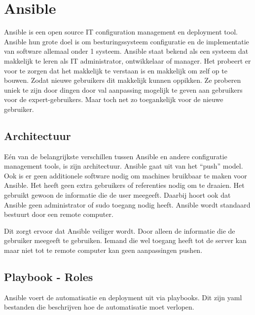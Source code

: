 \section{Ansible}
Ansible is een open source IT configuration management en deployment tool. Ansible hun grote doel is om besturingssysteem configuratie en de implementatie van software allemaal onder 1 systeem. Ansible staat bekend als een systeem dat makkelijk te leren als IT administrator, ontwikkelaar of manager. Het probeert er voor te zorgen dat het makkelijk te verstaan is en makkelijk om zelf op te bouwen. Zodat nieuwe gebruikers dit makkelijk kunnen oppikken. Ze proberen uniek te zijn door dingen door val aanpassing mogelijk te geven aan gebruikers voor de expert-gebruikers. Maar toch net zo toegankelijk voor de nieuwe gebruiker.

\subsection{Architectuur}
Eén van de belangrijkste verschillen tussen Ansible en andere configuratie management tools, is zijn architectuur. Ansible gaat uit van het ``push'' model. Ook is er geen additionele software nodig om machines bruikbaar te maken voor Ansible. Het heeft geen extra gebruikers of referenties nodig om te draaien. Het gebruikt gewoon de informatie die de user meegeeft. Daarbij hoort ook dat Ansible geen administrator of sudo toegang nodig heeft. Ansible wordt standaard bestuurt door een remote computer.

Dit zorgt ervoor dat Ansible veiliger wordt. Door alleen de informatie die de gebruiker meegeeft te gebruiken. Iemand die wel toegang heeft tot de server kan maar niet tot te remote computer kan geen aanpassingen pushen.

\subsection{Playbook - Roles}
Ansible voert de automatisatie en deployment uit via playbooks. Dit zijn yaml bestanden die beschrijven hoe de automatisatie moet verlopen. 

